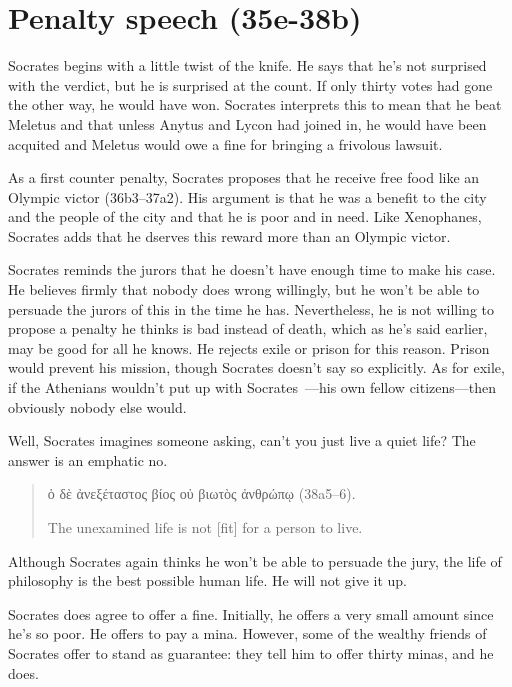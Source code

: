 \documentclass[11pt]{article}
\begin{document}


\section{Penalty speech (35e-38b)}

Socrates begins with a little twist of the knife.  He says that he's not surprised with the verdict, but he is surprised at the count. If only thirty votes had gone the other way, he would have won.  Socrates interprets this to mean that he beat Meletus and that unless Anytus and Lycon had joined in, he would have been acquited and Meletus would owe a fine for bringing a frivolous lawsuit.

As a first counter penalty, Socrates proposes that he receive free food like an Olympic victor (36b3--37a2).  His argument is that he was a benefit to the city and the people of the city and that he is poor and in need.  Like Xenophanes, Socrates adds that he dserves this reward more than an Olympic victor.

Socrates reminds the jurors that he doesn't have enough time to make his case.  He believes firmly that nobody does wrong willingly, but he won't be able to persuade the jurors of this in the time he has.  Nevertheless, he is not willing to propose a penalty he thinks is bad instead of death, which as he's said earlier, may be good for all he knows.  He rejects exile or prison for this reason.  Prison would prevent his mission, though Socrates doesn't say so explicitly.  As for exile, if the Athenians wouldn't put up with Socrates~---his own fellow citizens---then obviously nobody else would.

Well, Socrates imagines someone asking, can't you just live a quiet life?  The answer is an emphatic no.

\begin{quote}
    {\g ὁ δὲ ἀνεξέταστος βίος οὐ βιωτὸς ἀνθρώπῳ} (38a5--6).

    The unexamined life is not [fit] for a person to live.
\end{quote}

Although Socrates again thinks he won't be able to persuade the jury, the life of philosophy is the best possible human life.  He will not give it up.

Socrates does agree to offer a fine.  Initially, he offers a very small amount since he's so poor.  He offers to pay a mina.  However, some of the wealthy friends of Socrates offer to stand as guarantee: they tell him to offer thirty minas, and he does.
\end{document}
